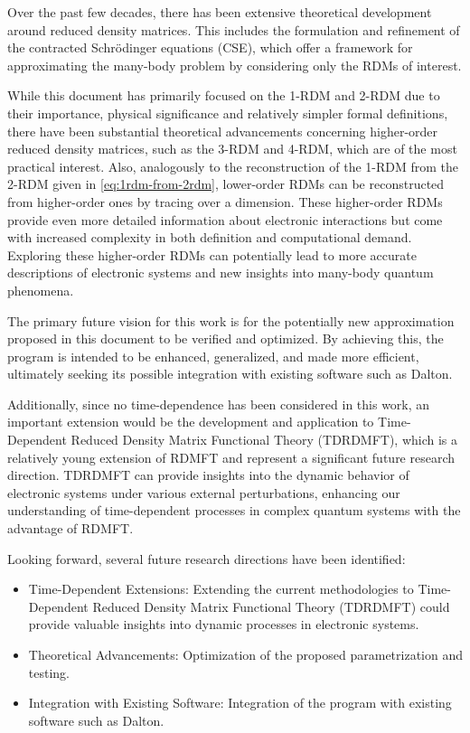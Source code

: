 Over the past few decades, there has been extensive theoretical development 
around reduced density matrices.
This includes the formulation and refinement of the contracted Schrödinger 
equations (CSE), which offer a framework for approximating the many-body 
problem by considering only the RDMs of interest.

While this document has primarily focused on the 1-RDM and 2-RDM due to their 
importance, physical significance and relatively simpler formal definitions,
there have been substantial theoretical advancements concerning higher-order
reduced density matrices, such as the 3-RDM and 4-RDM, which are of the most
practical interest.
Also, analogously to the reconstruction of the 1-RDM from the 2-RDM given in
\cref{eq:1rdm-from-2rdm}, lower-order RDMs can be reconstructed from higher-order
ones by tracing over a dimension.
These higher-order RDMs provide even more detailed information about 
electronic interactions but come with increased complexity in both definition 
and computational demand.
Exploring these higher-order RDMs can potentially lead to more accurate 
descriptions of electronic systems and new insights into many-body quantum 
phenomena.

The primary future vision for this work is for the potentially new 
approximation proposed in this document to be verified and optimized. 
By achieving this, the program is intended to be enhanced, generalized, and 
made more efficient, ultimately seeking its possible integration with existing 
software such as Dalton.

Additionally, since no time-dependence has been considered in this work, 
an important extension would be the development and application to Time-Dependent
Reduced Density Matrix Functional Theory (TDRDMFT), which is a relatively 
young extension of RDMFT and represent a significant future research direction.
TDRDMFT can provide insights into the dynamic behavior of 
electronic systems under various external perturbations, enhancing our 
understanding of time-dependent processes in complex quantum systems with
the advantage of RDMFT.

Looking forward, several future research directions have been identified:
\begin{itemize}
    \item Time-Dependent Extensions:
        Extending the current methodologies to Time-Dependent Reduced Density 
        Matrix Functional Theory (TDRDMFT) could provide valuable insights 
        into dynamic processes in electronic systems.
    \item Theoretical Advancements:
        Optimization of the proposed parametrization and testing.
    \item Integration with Existing Software:
        Integration of the program with existing software such as Dalton.
\end{itemize}

